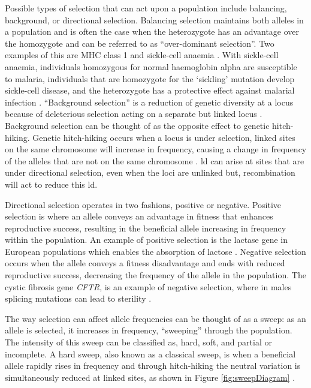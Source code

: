 \documentclass[]{report}
\begin{document}
Possible types of selection that can act upon a population include
balancing, background, or directional selection. Balancing selection
maintains both alleles in a population and is often the case when the
heterozygote has an advantage over the homozygote and can be referred to
as ``over-dominant selection''. Two examples of this are MHC class 1
\citep{Hughes1988} and sickle-cell anaemia \citep{Allison1956}. With
sickle-cell anaemia, individuals homozygous for normal haemoglobin alpha
are susceptible to malaria, individuals that are homozygote for the
`sickling' mutation develop sickle-cell disease, and the heterozygote
has a protective effect against malarial infection \citep{Aidoo2002}.
``Background selection'' is a reduction of genetic diversity at a locus
because of deleterious selection acting on a separate but linked locus
\citep{Charlesworth1993}. Background selection can be thought of as the
opposite effect to genetic hitch-hiking. Genetic hitch-hiking occurs
when a locus is under selection, linked sites on the same chromosome
will increase in frequency, causing a change in frequency of the alleles
that are not on the same chromosome \citep{Smith1974}. \Gls{ld} can
arise at sites that are under directional selection, even when the loci
are unlinked \citep{Felsenstein1965} but, recombination will act to
reduce this \gls{ld}.

Directional selection operates in two fashions, positive or negative.
Positive selection is where an allele conveys an advantage in fitness
that enhances reproductive success, resulting in the beneficial allele
increasing in frequency within the population. An example of positive
selection is the lactase gene in European populations which enables the
absorption of lactose \citep{Bersaglieri2004}. Negative selection occurs
when the allele conveys a fitness disadvantage and ends with reduced
reproductive success, decreasing the frequency of the allele in the
population. The cystic fibrosis gene \emph{CFTR}, is an example of
negative selection, where in males splicing mutations can lead to
sterility \citep{Pagani2005}.

The way selection can affect allele frequencies can be thought of as a
sweep: as an allele is selected, it increases in frequency, ``sweeping''
through the population. The intensity of this sweep can be classified
as, hard, soft, and partial or incomplete. A hard sweep, also known as a
classical sweep, is when a beneficial allele rapidly rises in frequency
and through hitch-hiking the neutral variation is simultaneously reduced
at linked sites, as shown in Figure \ref{fig:sweepDiagram}
\citep{Smith1974, Hermisson2005, Nielsen2005, Hermisson2017}.
\end{document}
